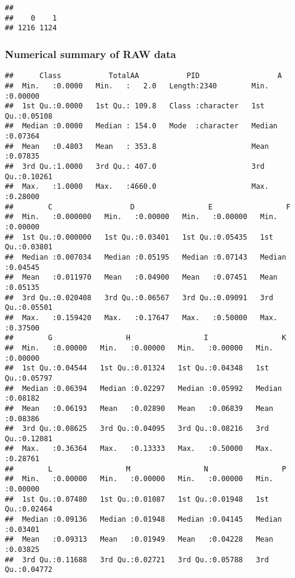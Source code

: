 \documentclass[]{article}
\begin{document}
\begin{verbatim}
## 
##    0    1 
## 1216 1124
\end{verbatim}

\hypertarget{numerical-summary-of-raw-data}{%
\subsubsection{Numerical summary of RAW
data}\label{numerical-summary-of-raw-data}}

\begin{verbatim}
##      Class           TotalAA           PID                  A          
##  Min.   :0.0000   Min.   :   2.0   Length:2340        Min.   :0.00000  
##  1st Qu.:0.0000   1st Qu.: 109.8   Class :character   1st Qu.:0.05108  
##  Median :0.0000   Median : 154.0   Mode  :character   Median :0.07364  
##  Mean   :0.4803   Mean   : 353.8                      Mean   :0.07835  
##  3rd Qu.:1.0000   3rd Qu.: 407.0                      3rd Qu.:0.10261  
##  Max.   :1.0000   Max.   :4660.0                      Max.   :0.28000  
##        C                  D                 E                 F          
##  Min.   :0.000000   Min.   :0.00000   Min.   :0.00000   Min.   :0.00000  
##  1st Qu.:0.000000   1st Qu.:0.03401   1st Qu.:0.05435   1st Qu.:0.03801  
##  Median :0.007034   Median :0.05195   Median :0.07143   Median :0.04545  
##  Mean   :0.011970   Mean   :0.04900   Mean   :0.07451   Mean   :0.05135  
##  3rd Qu.:0.020408   3rd Qu.:0.06567   3rd Qu.:0.09091   3rd Qu.:0.05501  
##  Max.   :0.159420   Max.   :0.17647   Max.   :0.50000   Max.   :0.37500  
##        G                 H                 I                 K          
##  Min.   :0.00000   Min.   :0.00000   Min.   :0.00000   Min.   :0.00000  
##  1st Qu.:0.04544   1st Qu.:0.01324   1st Qu.:0.04348   1st Qu.:0.05797  
##  Median :0.06394   Median :0.02297   Median :0.05992   Median :0.08182  
##  Mean   :0.06193   Mean   :0.02890   Mean   :0.06839   Mean   :0.08386  
##  3rd Qu.:0.08625   3rd Qu.:0.04095   3rd Qu.:0.08216   3rd Qu.:0.12081  
##  Max.   :0.36364   Max.   :0.13333   Max.   :0.50000   Max.   :0.28761  
##        L                 M                 N                 P          
##  Min.   :0.00000   Min.   :0.00000   Min.   :0.00000   Min.   :0.00000  
##  1st Qu.:0.07480   1st Qu.:0.01087   1st Qu.:0.01948   1st Qu.:0.02464  
##  Median :0.09136   Median :0.01948   Median :0.04145   Median :0.03401  
##  Mean   :0.09313   Mean   :0.01949   Mean   :0.04228   Mean   :0.03825  
##  3rd Qu.:0.11688   3rd Qu.:0.02721   3rd Qu.:0.05788   3rd Qu.:0.04772  

\end{verbatim}
\end{document}
